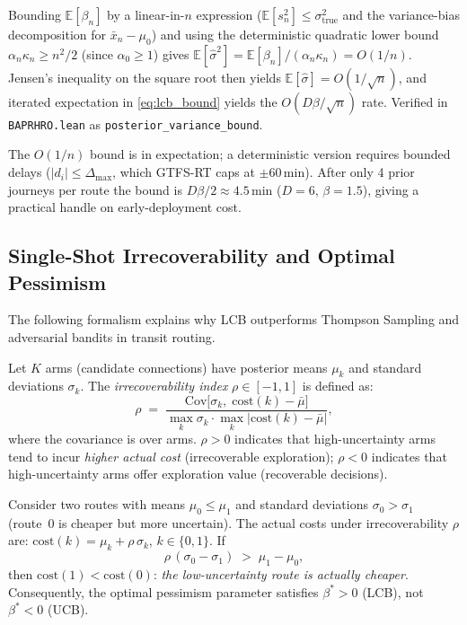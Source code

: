 \documentclass[opre,dblanonrev]{informs4}
\renewenvironment{proof}{\Trivlist\item[\hspace*{1em}\hskip\labelsep{\itshape Proof.\enskip}]\ignorespaces}{\endTrivlist\addvspace{0pt}}
\begin{document}
\begin{proof}[Proof sketch (full proof in EC.\ref{ec:detailed_proofs}).]
Bounding $\mathbb{E}[\beta_n]$ by a linear-in-$n$ expression
($\mathbb{E}[s_n^2]\leq\sigma_{\mathrm{true}}^2$ and the variance-bias
decomposition for $\bar x_n-\mu_0$) and using the deterministic
quadratic lower bound
$\alpha_n\kappa_n\geq n^2/2$ (since $\alpha_0\geq 1$) gives
$\mathbb{E}[\hat\sigma^2] = \mathbb{E}[\beta_n]/(\alpha_n\kappa_n)
=O(1/n)$. Jensen's inequality on the square root then yields
$\mathbb{E}[\hat\sigma]=O(1/\sqrt{n})$, and iterated expectation in
\eqref{eq:lcb_bound} yields the $O(D\beta/\sqrt{n})$ rate.
Verified in \texttt{BAPRHRO.lean} as
\texttt{posterior\_variance\_bound}.
\end{proof}

\begin{remark}
The $O(1/n)$ bound is in expectation; a deterministic version requires
bounded delays ($|d_i|\leq\Delta_{\max}$, which GTFS-RT caps at
$\pm 60$\,min). After only 4 prior journeys per route the bound is
$D\beta/2\!\approx\!4.5$\,min ($D{=}6$, $\beta{=}1.5$), giving a
practical handle on early-deployment cost.
\end{remark}

\subsection{Single-Shot Irrecoverability and Optimal Pessimism}

The following formalism explains why LCB outperforms Thompson Sampling
and adversarial bandits in transit routing.

\begin{definition}\label{def:rho}
Let $K$ arms (candidate connections) have posterior means $\mu_k$
and standard deviations $\sigma_k$.
The \emph{irrecoverability index} $\rho \in [-1, 1]$ is defined as:
\[
\rho \;=\; \frac{\mathrm{Cov}\bigl[\sigma_k,\;\mathrm{cost}(k) - \bar\mu\bigr]}
               {\max_k \sigma_k \cdot \max_k |\mathrm{cost}(k) - \bar\mu|},
\]
where the covariance is over arms.
$\rho > 0$ indicates that high-uncertainty arms tend to incur
\emph{higher actual cost} (irrecoverable exploration);
$\rho < 0$ indicates that high-uncertainty arms offer
exploration value (recoverable decisions).
\end{definition}

\begin{theorem}\label{thm:rho}
Consider two routes with means $\mu_0 \leq \mu_1$ and standard deviations
$\sigma_0 > \sigma_1$ (route~0 is cheaper but more uncertain).
The actual costs under irrecoverability $\rho$ are:
$\mathrm{cost}(k) = \mu_k + \rho\,\sigma_k$, $k \in \{0,1\}$.
If
\[
\rho\,(\sigma_0 - \sigma_1) \;>\; \mu_1 - \mu_0,
\]
then $\mathrm{cost}(1) < \mathrm{cost}(0)$:
\emph{the low-uncertainty route is actually cheaper}.
Consequently, the optimal pessimism parameter satisfies $\beta^* > 0$ (LCB),
not $\beta^* < 0$ (UCB).
\end{theorem}
\end{document}
